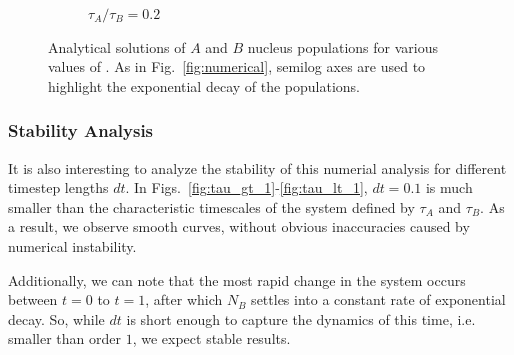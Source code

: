 \documentclass[pra,twocolumn,showpacs,amsmath,amssymb]{revtex4-1}
\begin{document}
\begin{figure}
\begin{subfigure}{.7\linewidth}
    \caption{$\tau_A / \tau_B=0.2$}
    \label{fig:exact_tau_lt_1}
  \end{subfigure}

  \caption{Analytical solutions of $A$ and $B$ nucleus populations for various values of \trel.
  As in Fig.~\ref{fig:numerical}, semilog axes are used to highlight the
  exponential decay of the populations.}
  \label{fig:analytical}
\end{figure}

\subsubsection{Stability Analysis}\label{sec:stability}

It is also interesting to analyze the stability of this numerial analysis for
different timestep lengths $dt$. In Figs.~\ref{fig:tau_gt_1}-\ref{fig:tau_lt_1},
$dt=0.1$ is much smaller than the characteristic timescales of the system defined
by $\tau_A$ and $\tau_B$. As a result, we observe smooth curves, without obvious
inaccuracies caused by numerical instability.

Additionally, we can note that the most rapid change in the system occurs between
$t=0$ to $t=1$, after which $N_B$ settles into a constant
rate of exponential decay. So, while $dt$ is short enough to capture the dynamics
of this time, i.e. smaller than order $1$, we expect stable results.
\end{document}

